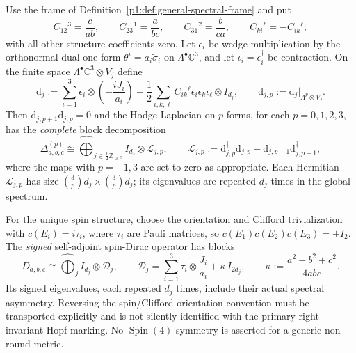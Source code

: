 \documentclass[11pt]{article}
\begin{document}
\begin{theorem}
\label{p1:thm:general-left-invariant-hodge-dirac-compiler}
Use the frame of Definition~\ref{p1:def:general-spectral-frame} and put
\[
  C_{12}{}^3=\frac{c}{ab},\qquad
  C_{23}{}^1=\frac{a}{bc},\qquad
  C_{31}{}^2=\frac{b}{ca},
  \qquad C_{ki}{}^\ell=-C_{ik}{}^\ell,
\]
with all other structure coefficients zero.  Let $\epsilon_i$ be wedge
multiplication by the orthonormal dual one-form $\theta^i=a_i\tilde\sigma_i$
on $\Lambda^\bullet\mathbb C^3$, and let $\iota_i=\epsilon_i^\dagger$
be contraction.  On the finite space
$\Lambda^\bullet\mathbb C^3\otimes V_j$ define
\begin{equation}\label{p1:eq:general-hodge-differential}
 \mathrm{d}_j:=\sum_{i=1}^3\epsilon_i\otimes
            \left(-\frac{iJ_i}{a_i}\right)
 -\frac12\sum_{i,k,\ell}C_{ik}{}^\ell
            \epsilon_i\epsilon_k\iota_\ell\otimes I_{d_j},
 \qquad \mathrm{d}_{j,p}:=\mathrm{d}_j|_{\Lambda^p\otimes V_j}.
\end{equation}
Then $\mathrm{d}_{j,p+1}\mathrm{d}_{j,p}=0$ and the Hodge Laplacian on
$p$-forms, for each $p=0,1,2,3$, has the \emph{complete} block decomposition
\begin{equation}\label{p1:eq:general-hodge-blocks}
 \Delta^{(p)}_{a,b,c}\cong
  \widehat{\bigoplus}_{j\in\frac12\mathbb Z_{\ge0}}
       I_{d_j}\otimes\mathscr L_{j,p},\qquad
 \mathscr L_{j,p}:=
       \mathrm{d}_{j,p}^\dagger\mathrm{d}_{j,p}
      +\mathrm{d}_{j,p-1}\mathrm{d}_{j,p-1}^\dagger,
\end{equation}
where the maps with $p=-1,3$ are set to zero as appropriate.
Each Hermitian $\mathscr L_{j,p}$ has size
$\binom{3}{p}d_j\times\binom{3}{p}d_j$; its eigenvalues are repeated
$d_j$ times in the global spectrum.

For the unique spin structure, choose the orientation and Clifford
trivialization with $c(E_i)=i\tau_i$, where $\tau_i$ are Pauli matrices,
so $c(E_1)c(E_2)c(E_3)=+I_2$.  The \emph{signed} self-adjoint spin-Dirac
operator has blocks
\begin{equation}\label{p1:eq:general-dirac-blocks}
 D_{a,b,c}\cong\widehat{\bigoplus}_{j}
 I_{d_j}\otimes\mathscr D_j,\qquad
 \mathscr D_j=\sum_{i=1}^3\tau_i\otimes\frac{J_i}{a_i}
       +\kappa\, I_{2d_j},\qquad
 \kappa:=\frac{a^2+b^2+c^2}{4abc}.
\end{equation}
Its signed eigenvalues, each repeated $d_j$ times, include their actual
spectral asymmetry.  Reversing the spin/Clifford orientation convention
must be transported explicitly and is not silently identified with the
primary right-invariant Hopf marking.  No $\operatorname{Spin}(4)$ symmetry
is asserted for a generic non-round metric.
\end{theorem}
\end{document}
